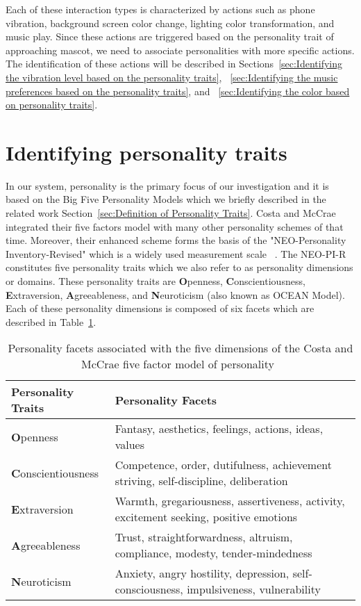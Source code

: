 Each of these interaction types is characterized by actions such as phone vibration,
background screen color change, lighting color transformation, and music play.
Since these actions are triggered based on the personality trait of approaching mascot,
we need to associate personalities with more specific actions.
The identification of these actions will be described in
Sections~\ref{sec:Identifying the vibration level based on the personality traits},
~\ref{sec:Identifying the music preferences based on the personality traits},
and ~\ref{sec:Identifying the color based on personality traits}.

\section{Identifying personality traits}
\label{sec:Identifying personality traits}

In our system, personality is the primary focus of our investigation and
it is based on the Big Five Personality Models which we briefly described
in the related work Section~\ref{sec:Definition of Personality Traits}.
Costa and McCrae integrated their five factors model with many other personality schemes of that time.
Moreover, their enhanced scheme forms the basis of the "NEO-Personality Inventory-Revised"
which is a widely used measurement scale ~\cite{costa2008revised}.
The NEO-PI-R constitutes five personality traits which we also refer to as personality dimensions or domains.
These personality traits are \textbf{O}penness, \textbf{C}onscientiousness,
\textbf{E}xtraversion, \textbf{A}greeableness, and \textbf{N}euroticism (also known as  OCEAN Model).
Each of these personality dimensions is composed of six facets which are described in Table~\ref{table:personality}.

\begin{table} [h]
\centering
\begin{tabular}{ | m{8em} | m{25em}| }
\hline
\textbf{Personality Traits} & \textbf{Personality Facets}  \\
\hline
\textbf{O}penness & Fantasy, aesthetics, feelings, actions, ideas, values  \\
\hline 
\textbf{C}onscientiousness & Competence, order, dutifulness, achievement striving, self-discipline, deliberation  \\
\hline 
\textbf{E}xtraversion & Warmth, gregariousness, assertiveness, activity, excitement seeking, positive emotions \\
\hline 
\textbf{A}greeableness & Trust, straightforwardness, altruism, compliance, modesty, tender-mindedness  \\
\hline 
\textbf{N}euroticism & Anxiety, angry hostility, depression, self-consciousness, impulsiveness, vulnerability \\
\hline
\end{tabular}
\caption{Personality facets associated with the five dimensions of the Costa and McCrae five factor model of personality~\cite{costa2008revised, matthews2003personality}}
\label{table:personality}
\end{table}

